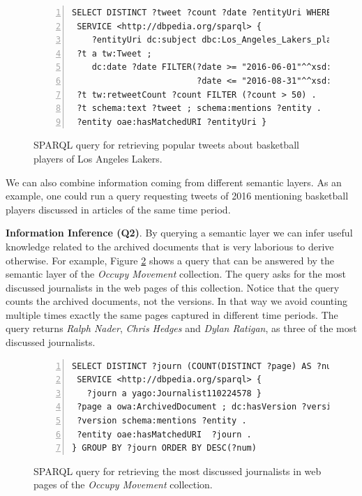\documentclass{libtex/sig-alternate-05-2015}
\begin{document}
\begin{figure}[th]
\vspace{-2mm}
\centering \scriptsize
\begin{Verbatim}[frame=lines,numbers=left,numbersep=1pt]
SELECT DISTINCT ?tweet ?count ?date ?entityUri WHERE {
 SERVICE <http://dbpedia.org/sparql> {
    ?entityUri dc:subject dbc:Los_Angeles_Lakers_players  }
 ?t a tw:Tweet ;
    dc:date ?date FILTER(?date >= "2016-06-01"^^xsd:dateTime &&
                         ?date <= "2016-08-31"^^xsd:dateTime)
 ?t tw:retweetCount ?count FILTER (?count > 50) .
 ?t schema:text ?tweet ; schema:mentions ?entity .
 ?entity oae:hasMatchedURI ?entityUri }
 \end{Verbatim}
\vspace{-6mm}
\caption{SPARQL query for retrieving popular tweets
about basketball players of Los Angeles Lakers.}
\label{fig:queryExampleTweet}
\vspace{-2mm}
\end{figure}

We can also combine information coming from
different semantic layers.
As an example, one could run a query
requesting tweets of 2016 mentioning
basketball players discussed in articles of the
same time period.

\vspace{1mm} \noindent
{\bf Information Inference (Q2)}.
By querying a semantic layer we can infer
useful knowledge related to the archived documents
that is very laborious to derive otherwise.
For example,
Figure \ref{fig:queryExampleInfer} shows a query that can be answered by the semantic layer
of the {\em Occupy Movement} collection.
The query asks for the most discussed journalists in the
web pages of this collection.
Notice that the query counts the archived documents, not the versions.
In that way we avoid counting multiple times exactly the same pages
captured in different time periods.
The query returns {\em Ralph Nader},
{\em Chris Hedges} and {\em Dylan Ratigan},
as three of the most discussed journalists.

\begin{figure}[th]
\vspace{-2mm}
\centering \scriptsize
\begin{Verbatim}[frame=lines,numbers=left,numbersep=1pt]
SELECT DISTINCT ?journ (COUNT(DISTINCT ?page) AS ?num) WHERE {
 SERVICE <http://dbpedia.org/sparql> {
   ?journ a yago:Journalist110224578 }
 ?page a owa:ArchivedDocument ; dc:hasVersion ?version .
 ?version schema:mentions ?entity .
 ?entity oae:hasMatchedURI  ?journ .
} GROUP BY ?journ ORDER BY DESC(?num)
\end{Verbatim}
\vspace{-6mm}
\caption{SPARQL query for retrieving the most discussed
journalists in web pages of the {\em Occupy Movement} collection.}
\label{fig:queryExampleInfer}
\vspace{-2mm}
\end{figure}
\end{document}
